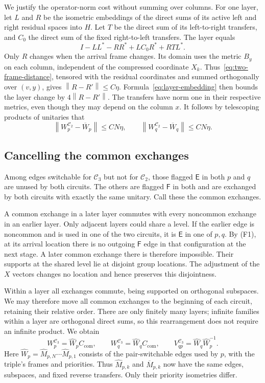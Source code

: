 \documentclass[11pt]{article}
\numberwithin{equation}{section}
\theoremstyle{definition}
\theoremstyle{remark}
\newcommand{\norm}[1]{\left\lVert#1\right\rVert}
\newcommand{\E}{\mathsf E}
\newcommand{\F}{\mathsf F}
\newcommand{\cC}{\mathcal C}
\begin{document}
We justify the operator-norm cost without summing over columns. For one
layer, let $L$ and $R$ be the isometric embeddings of the direct sums of
its active left and right residual spaces into $H$. Let $T$ be the direct
sum of its left-to-right transfers, and $C_0$ the direct sum of the fixed
right-to-left transfers. The layer equals
\begin{equation}\label{eq:layer-embedding}
 I-LL^*-RR^*+LC_0R^*+RTL^*.
\end{equation}
Only $R$ changes when the arrival frame changes. Its domain uses the
metric $B_y$ on each column, independent of the compressed coordinate
$X_k$. Thus~\eqref{eq:two-frame-distance}, tensored with the residual
coordinates and summed orthogonally over $(v,y)$, gives
$\norm{R-R'}\le C\eta$. Formula~\eqref{eq:layer-embedding} then bounds
the layer change by $4\norm{R-R'}$. The transfers have norm one in their
respective metrics, even though they may depend on the column $x$.
It follows by telescoping products of unitaries that
\begin{equation}\label{eq:frame-circuit-cost}
 \norm{W_p^{\cC_2}-\overline W_p}\le CN\eta,
 \qquad \norm{W_q^{\cC_2}-\overline W_q}\le CN\eta.
\end{equation}

\subsection{Cancelling the common exchanges}
Among edges switchable for $\cC_3$ but not for $\cC_2$, those flagged $\E$
in both $p$ and $q$ are unused by both circuits. The others are flagged
$\F$ in both and are exchanged by both circuits with exactly the same
unitary. Call these the common exchanges.

A common exchange in a later layer commutes with every noncommon exchange
in an earlier layer. Only adjacent layers could share a level. If the
earlier edge is noncommon and is used in one of the two circuits, it is
$\E$ in one of $p,q$. By (F1), at its arrival location there is no outgoing
$\F$ edge in that configuration at the next stage. A later common exchange
there is therefore impossible. Their supports at the shared level lie
at disjoint group locations. The adjustment of the $X$ vectors changes
no location and hence preserves this disjointness.

Within a layer all exchanges commute, being supported on orthogonal
subspaces. We may therefore move all common exchanges to the beginning
of each circuit, retaining their relative order. There are only finitely
many layers; infinite families within a layer are orthogonal direct sums,
so this rearrangement does not require an infinite product. We obtain
\begin{equation}\label{eq:common-cancel}
 W_p^{\cC_3}=\widehat W_p C_{\mathrm{com}},\qquad
 W_q^{\cC_3}=\widehat W_q C_{\mathrm{com}},\qquad
 V_{qp}^{\cC_3}=\widehat W_q\widehat W_p^{-1}.
\end{equation}
Here $\widehat W_p=\widehat M_{p,N}\cdots\widehat M_{p,1}$ consists
of the pair-switchable edges used by $p$, with the triple's frames and
priorities. Thus $\widehat M_{p,k}$ and $\overline M_{p,k}$ now have the
same edges, subspaces, and fixed reverse transfers. Only their priority
isometries differ.
\end{document}

